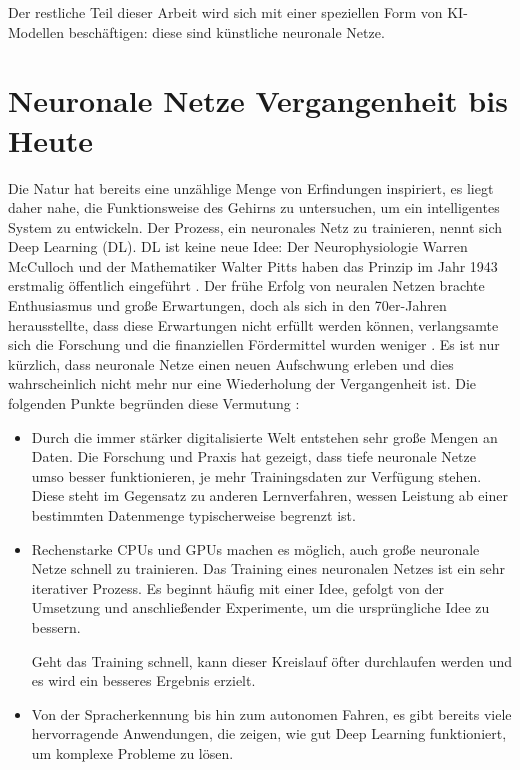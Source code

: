 \noindent
Der restliche Teil dieser Arbeit wird sich mit einer
speziellen Form von KI-Modellen beschäftigen: diese sind künstliche
neuronale Netze.

\section{Neuronale Netze Vergangenheit bis Heute}
Die Natur hat bereits eine unzählige Menge von Erfindungen
inspiriert, es liegt daher nahe, die Funktionsweise des Gehirns zu
untersuchen, um ein intelligentes System zu entwickeln.
Der Prozess, ein neuronales Netz zu trainieren, nennt sich Deep Learning (DL).
DL ist keine neue Idee:
Der Neurophysiologie Warren McCulloch und der Mathematiker Walter Pitts
haben das Prinzip im Jahr 1943 erstmalig öffentlich eingeführt
\parencite[280]{book:hands-on-ml}. Der frühe Erfolg von neuralen
Netzen brachte Enthusiasmus und große Erwartungen,
doch als sich in den 70er-Jahren herausstellte, dass diese Erwartungen nicht erfüllt
werden können, verlangsamte sich die Forschung und die finanziellen Fördermittel
wurden weniger \parencite[280]{book:hands-on-ml}.
Es ist nur kürzlich, dass neuronale Netze einen neuen Aufschwung erleben
und dies wahrscheinlich nicht mehr nur eine Wiederholung der Vergangenheit ist.
Die folgenden Punkte begründen diese Vermutung \parencite[280]{book:hands-on-ml}:
\begin{itemize}
  \item Durch die immer stärker digitalisierte Welt
        entstehen sehr große Mengen an Daten.
        Die Forschung und Praxis hat gezeigt, dass tiefe neuronale Netze umso besser funktionieren,
        je mehr Trainingsdaten zur Verfügung stehen. Diese steht im Gegensatz
        zu anderen Lernverfahren, wessen Leistung ab einer bestimmten
        Datenmenge typischerweise begrenzt ist.
  \item Rechenstarke CPUs und GPUs machen es möglich,
        auch große neuronale Netze
        schnell zu trainieren. Das Training eines neuronalen
        Netzes ist ein sehr iterativer Prozess.
        Es beginnt häufig mit einer Idee,
        gefolgt von der Umsetzung und anschließender Experimente, um die ursprüngliche
        Idee zu bessern.
        

        \noindent
        Geht das Training schnell, kann dieser Kreislauf öfter durchlaufen
        werden und es wird ein besseres Ergebnis erzielt.
  \item Von der Spracherkennung bis hin zum autonomen Fahren,
        es gibt bereits viele hervorragende Anwendungen, die zeigen,
        wie gut Deep Learning funktioniert, um komplexe Probleme zu lösen.
\end{itemize}
